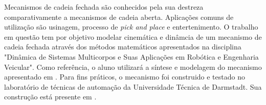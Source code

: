 \documentclass[]{article}
\title{}
\author{Bruno Peixoto}
\begin{document}
\maketitle

Mecanismos de cadeia fechada são conhecidos pela sua destreza comparativamente a mecanismos de cadeia aberta. Aplicações comuns de utilização são usinagem, processo de \emph{pick and place} e entertenimento. O trabalho em questão tem por objetivo modelar  cinemática e dinâmcia de um mecanismo de cadeia fechada através dos métodos matemáticos apresentados na disciplina "Dinâmica de Sistemas Multicorpos e Suas Aplicações em
Robótica e Engenharia Veicular". Como referência, o aluno utilizará a síntese e modelagem do mecanismo apresentado em  \autocite{tubiblio52241}. Para fins práticos, o mecanismo foi construido e testado no laboratório de técnicas de automação da Universidade Técnica de Darmstadt. Sua construção está presente em \autocite{deskriptor2014}.

\printbibliography 
\end{document}
